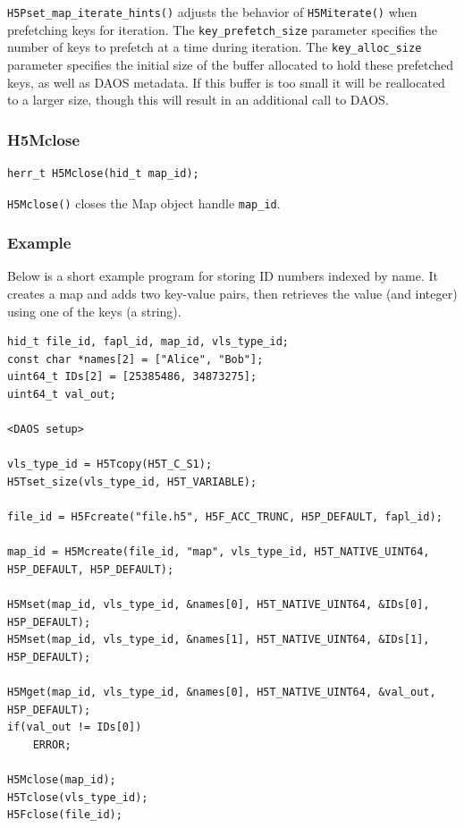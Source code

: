 \verb+H5Pset_map_iterate_hints()+ adjusts the behavior of \verb+H5Miterate()+ when prefetching keys for iteration. The \verb+key_prefetch_size+ parameter specifies the number of keys to prefetch at a time during iteration. The \verb+key_alloc_size+ parameter specifies the initial size of the buffer allocated to hold these prefetched keys, as well as DAOS metadata. If this buffer is too small it will be reallocated to a larger size, though this will result in an additional call to DAOS.

\subsubsection{H5Mclose}

{
\begin{lstlisting}
herr_t H5Mclose(hid_t map_id);
\end{lstlisting}
}

\verb+H5Mclose()+ closes the Map object handle \verb+map_id+.

\subsubsection{Example}

Below is a short example program for storing ID numbers indexed by name. It creates a map and adds two key-value pairs, then retrieves the value (and integer) using one of the keys (a string).
{
\begin{lstlisting}
hid_t file_id, fapl_id, map_id, vls_type_id;
const char *names[2] = ["Alice", "Bob"];
uint64_t IDs[2] = [25385486, 34873275];
uint64_t val_out;

<DAOS setup>

vls_type_id = H5Tcopy(H5T_C_S1);
H5Tset_size(vls_type_id, H5T_VARIABLE);

file_id = H5Fcreate("file.h5", H5F_ACC_TRUNC, H5P_DEFAULT, fapl_id);

map_id = H5Mcreate(file_id, "map", vls_type_id, H5T_NATIVE_UINT64, H5P_DEFAULT, H5P_DEFAULT);

H5Mset(map_id, vls_type_id, &names[0], H5T_NATIVE_UINT64, &IDs[0], H5P_DEFAULT);
H5Mset(map_id, vls_type_id, &names[1], H5T_NATIVE_UINT64, &IDs[1], H5P_DEFAULT);

H5Mget(map_id, vls_type_id, &names[0], H5T_NATIVE_UINT64, &val_out, H5P_DEFAULT);
if(val_out != IDs[0])
	ERROR;

H5Mclose(map_id);
H5Tclose(vls_type_id);
H5Fclose(file_id);
\end{lstlisting}
}

